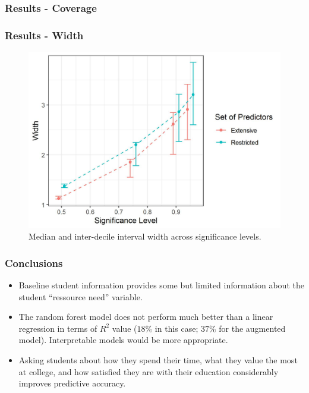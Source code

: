 \documentclass{beamer}
\begin{document}
\begin{frame} \frametitle{Results - Coverage}  

\end{frame}

\begin{frame} \frametitle{Results - Width}   
\begin{figure}
	\centering
	\includegraphics[scale = 0.5]{conformal.jpeg}
	\caption{Median and inter-decile interval width across significance levels.}
	\label{fig:conformal}
\end{figure}
\end{frame}

\begin{frame} \frametitle{Conclusions}

\begin{itemize}
	\item Baseline student information provides some but limited information about the student ``ressource need'' variable.
	\item The random forest model does not perform much better than a linear regression in terms of $R^2$ value ($18\%$ in this case; $37\%$ for the augmented model). Interpretable models would be more appropriate.
	\item Asking students about how they spend their time, what they value the most at college, and how satisfied they are with their education considerably improves predictive accuracy.
\end{itemize}


\end{frame}
\end{document}
